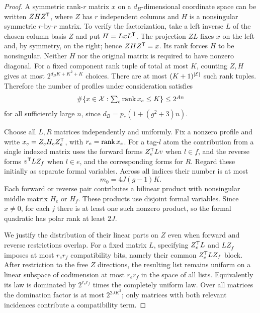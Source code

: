 \begin{proof}
A symmetric rank-$r$ matrix $x$ on a $d_B$-dimensional coordinate
space can be written $ZHZ^{\mathsf T}$, where $Z$ has $r$ independent
columns and $H$ is a nonsingular symmetric $r$-by-$r$ matrix.
To verify the factorization, take a left inverse $L$ of the
chosen column basis $Z$ and put $H=LxL^{\mathsf T}$.  The projection
$ZL$ fixes $x$ on the left and, by symmetry, on the right;
hence $ZHZ^{\mathsf T}=x$.  Its rank forces $H$ to be nonsingular.
Neither $H$ nor the original matrix is required to have nonzero
diagonal.  For a fixed component rank tuple of total at most
$K$, counting $Z,H$ gives at most $2^{d_BK+K^2+K}$ choices.
There are at most $(K+1)^{|\mathcal E|}$ such rank tuples.  Therefore
the number of profiles under consideration satisfies
\begin{equation}\label{eq:low-rank-profile-count}
 \#\{x\in\mathcal X:\textstyle\sum_e\operatorname{rank} x_e\le K\}\le2^{An}
\end{equation}
for all sufficiently large $n$, since
$d_B=p_*(1+(g^2+3)n)$.

Choose all $L,R$ matrices independently and uniformly.  Fix a
nonzero profile and write $x_e=Z_eH_eZ_e^{\mathsf T}$, with
$r_e=\operatorname{rank} x_e$.  For a tag-$l$ atom the contribution from a
single indexed matrix uses the forward forms $Z_e^{\mathsf T} L v$
when $l\in f$, and the reverse forms $v^{\mathsf T} L Z_f$ when
$l\in e$, and the corresponding forms for $R$.
Regard these initially as separate formal variables.  Across
all indices their number is at most
\[
 m_0=4J(g-1)K.
\]
Each forward or reverse pair contributes a bilinear product
with nonsingular middle matrix $H_e$ or $H_f$.  These products
use disjoint formal variables.  Since $x\ne0$, for each $j$
there is at least one such nonzero product, so the formal
quadratic has polar rank at least $2J$.

We justify the distribution of their linear parts on $Z$ even
when forward and reverse restrictions overlap.  For a fixed
matrix $L$, specifying $Z_e^{\mathsf T} L$ and $LZ_f$ imposes at
most $r_er_f$ compatibility bits, namely their common
$Z_e^{\mathsf T} LZ_f$ block.  After restriction to the free $Z$
directions, the resulting list remains uniform on a linear
subspace of codimension at most $r_er_f$ in the space of all
lists.  Equivalently its law is dominated by $2^{r_er_f}$ times
the completely uniform law.  Over all matrices the domination
factor is at most $2^{2JK^2}$; only matrices with both relevant
incidences contribute a compatibility term.


\end{proof}

